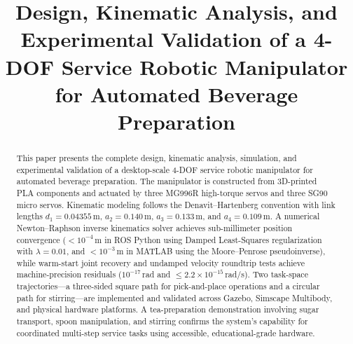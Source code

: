 \documentclass[conference]{IEEEtran}
\begin{document}
\title{Design, Kinematic Analysis, and Experimental Validation of a 4-DOF Service Robotic Manipulator for Automated Beverage Preparation}

\author{
\and
{}
\and
{}
\and
{}
\and
{}
\and
{}
}

\maketitle

\begin{abstract}
This paper presents the complete design, kinematic analysis, simulation, and experimental validation of a desktop-scale 4-DOF service robotic manipulator for automated beverage preparation. The manipulator is constructed from 3D-printed PLA components and actuated by three MG996R high-torque servos and three SG90 micro servos. Kinematic modeling follows the Denavit--Hartenberg convention with link lengths $d_1=0.04355$\,m, $a_2=0.140$\,m, $a_3=0.133$\,m, and $a_4=0.109$\,m. A numerical Newton--Raphson inverse kinematics solver achieves sub-millimeter position convergence ($<10^{-4}$\,m in ROS Python using Damped Least-Squares regularization with $\lambda=0.01$, and $<10^{-3}$\,m in MATLAB using the Moore--Penrose pseudoinverse), while warm-start joint recovery and undamped velocity roundtrip tests achieve machine-precision residuals ($10^{-17}$\,rad and $\le 2.2\times 10^{-15}$\,rad/s). Two task-space trajectories---a three-sided square path for pick-and-place operations and a circular path for stirring---are implemented and validated across Gazebo, Simscape Multibody, and physical hardware platforms. A tea-preparation demonstration involving sugar transport, spoon manipulation, and stirring confirms the system's capability for coordinated multi-step service tasks using accessible, educational-grade hardware.
\end{abstract}
\end{document}

